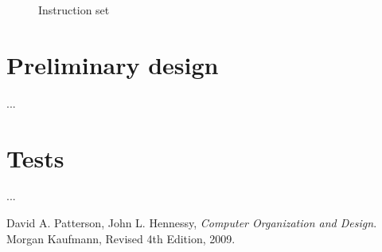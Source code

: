\documentclass[11pt,twoside,a4paper]{article}
\begin{document}
\begin{figure}[H]
\begin{multicols}{2}
	\end{multicols}
	\caption{Instruction set}
	\label{fig:instruction-set}
\end{figure}

\newpage
\pagestyle{fancy}
\section{Preliminary design}
...

\newpage
\pagestyle{fancy}
\section{Tests}
...

\newpage
\pagestyle{fancy}
\begin{thebibliography}{9}

  David A. Patterson, John L. Hennessy,
  \emph{Computer Organization and Design}.
  Morgan Kaufmann,
  Revised 4th Edition,
  2009.

\end{thebibliography}
\end{document}
